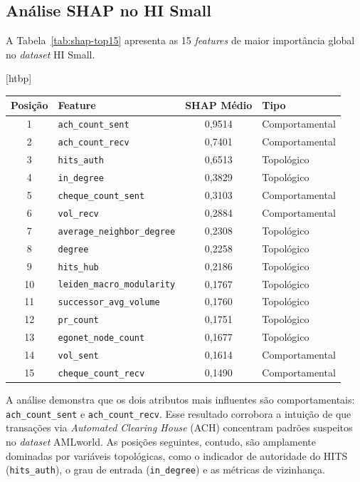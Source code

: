 \documentclass[a4paper,12pt,oneside,onecolumn,final,fleqn]{repUERJ}
\makeatletter
\renewenvironment{table}[1][htbp]
  {\@float{table}[#1]\centering}
  {\end@float}
\makeatother
\begin{document}
\subsection{Análise SHAP no HI Small}

A Tabela~\ref{tab:shap-top15} apresenta as 15 \textit{features} de maior importância global no \textit{dataset} HI Small.

\begin{table}
    \centering
    \caption{Top 15 features por importância SHAP global (HI Small)}
    \label{tab:shap-top15}
    \begin{tabular}{clSl}
        \hline
        \textbf{Posição} & \textbf{Feature} & {\textbf{SHAP Médio}} & \textbf{Tipo} \\
         & \texttt{ach\_count\_sent} & 0,9514 & Comportamental \\
        2 & \texttt{ach\_count\_recv} & 0,7401 & Comportamental \\
        3 & \texttt{hits\_auth} & 0,6513 & Topológico \\
        4 & \texttt{in\_degree} & 0,3829 & Topológico \\
        5 & \texttt{cheque\_count\_sent} & 0,3103 & Comportamental \\
        6 & \texttt{vol\_recv} & 0,2884 & Comportamental \\
        7 & \texttt{average\_neighbor\_degree} & 0,2308 & Topológico \\
        8 & \texttt{degree} & 0,2258 & Topológico \\
        9 & \texttt{hits\_hub} & 0,2186 & Topológico \\
        10 & \texttt{leiden\_macro\_modularity} & 0,1767 & Topológico \\
        11 & \texttt{successor\_avg\_volume} & 0,1760 & Topológico \\
        12 & \texttt{pr\_count} & 0,1751 & Topológico \\
        13 & \texttt{egonet\_node\_count} & 0,1677 & Topológico \\
        14 & \texttt{vol\_sent} & 0,1614 & Comportamental \\
        15 & \texttt{cheque\_count\_recv} & 0,1490 & Comportamental \\
        \hline
    \end{tabular}
\end{table}

A análise demonstra que os dois atributos mais influentes são comportamentais: \texttt{ach\_count\_sent} e \texttt{ach\_count\_recv}. Esse resultado corrobora a intuição de que transações via \textit{Automated Clearing House} (ACH) concentram padrões suspeitos no \textit{dataset} AMLworld. As posições seguintes, contudo, são amplamente dominadas por variáveis topológicas, como o indicador de autoridade do HITS (\texttt{hits\_auth}), o grau de entrada (\texttt{in\_degree}) e as métricas de vizinhança.
\end{document}
